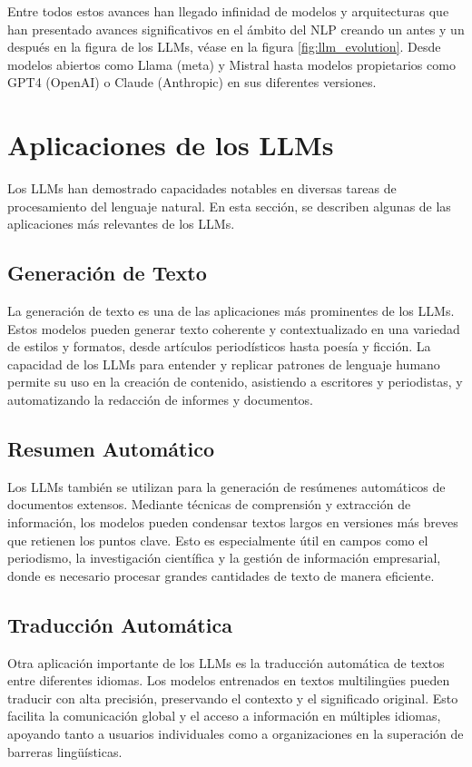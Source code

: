 Entre todos estos avances han llegado infinidad de modelos y arquitecturas que han presentado avances significativos en el ámbito del NLP creando un antes y un después en la figura de los LLMs, véase en la figura \ref{fig:llm_evolution}. Desde modelos abiertos como Llama (meta) y Mistral hasta modelos propietarios como GPT4 (OpenAI) o Claude (Anthropic) en sus diferentes versiones.


\section{Aplicaciones de los LLMs}
Los LLMs han demostrado capacidades notables en diversas tareas de procesamiento del lenguaje natural. En esta sección, se describen algunas de las aplicaciones más relevantes de los LLMs.

\subsection{Generación de Texto}
La generación de texto es una de las aplicaciones más prominentes de los LLMs. Estos modelos pueden generar texto coherente y contextualizado en una variedad de estilos y formatos, desde artículos periodísticos hasta poesía y ficción. La capacidad de los LLMs para entender y replicar patrones de lenguaje humano permite su uso en la creación de contenido, asistiendo a escritores y periodistas, y automatizando la redacción de informes y documentos.

\subsection{Resumen Automático}
Los LLMs también se utilizan para la generación de resúmenes automáticos de documentos extensos. Mediante técnicas de comprensión y extracción de información, los modelos pueden condensar textos largos en versiones más breves que retienen los puntos clave. Esto es especialmente útil en campos como el periodismo, la investigación científica y la gestión de información empresarial, donde es necesario procesar grandes cantidades de texto de manera eficiente.

\subsection{Traducción Automática}
Otra aplicación importante de los LLMs es la traducción automática de textos entre diferentes idiomas. Los modelos entrenados en textos multilingües pueden traducir con alta precisión, preservando el contexto y el significado original. Esto facilita la comunicación global y el acceso a información en múltiples idiomas, apoyando tanto a usuarios individuales como a organizaciones en la superación de barreras lingüísticas.

